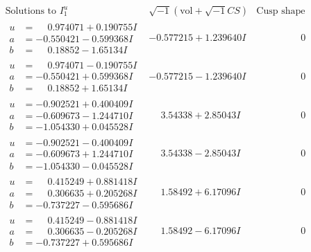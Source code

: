\documentclass[1p]{elsarticle_modified}
\theoremstyle{definition}
\newcommand{\I}{\sqrt{-1}}
\begin{document}
$$\begin{array}{c|c|c}  
\text{Solutions to }I^u_{1}& \I (\text{vol} + \sqrt{-1}CS) & \text{Cusp shape}\\
 \hline 
\begin{aligned}
u &= \phantom{-}0.974071 + 0.190755 I \\
a &= -0.550421 - 0.599368 I \\
b &= \phantom{-}0.18852 - 1.65134 I\end{aligned}
 & -0.577215 + 1.239640 I & \phantom{-0.000000 } 0 \\ \hline\begin{aligned}
u &= \phantom{-}0.974071 - 0.190755 I \\
a &= -0.550421 + 0.599368 I \\
b &= \phantom{-}0.18852 + 1.65134 I\end{aligned}
 & -0.577215 - 1.239640 I & \phantom{-0.000000 } 0 \\ \hline\begin{aligned}
u &= -0.902521 + 0.400409 I \\
a &= -0.609673 - 1.244710 I \\
b &= -1.054330 + 0.045528 I\end{aligned}
 & \phantom{-}3.54338 + 2.85043 I & \phantom{-0.000000 } 0 \\ \hline\begin{aligned}
u &= -0.902521 - 0.400409 I \\
a &= -0.609673 + 1.244710 I \\
b &= -1.054330 - 0.045528 I\end{aligned}
 & \phantom{-}3.54338 - 2.85043 I & \phantom{-0.000000 } 0 \\ \hline\begin{aligned}
u &= \phantom{-}0.415249 + 0.881418 I \\
a &= \phantom{-}0.306635 + 0.205268 I \\
b &= -0.737227 - 0.595686 I\end{aligned}
 & \phantom{-}1.58492 + 6.17096 I & \phantom{-0.000000 } 0 \\ \hline\begin{aligned}
u &= \phantom{-}0.415249 - 0.881418 I \\
a &= \phantom{-}0.306635 - 0.205268 I \\
b &= -0.737227 + 0.595686 I\end{aligned}
 & \phantom{-}1.58492 - 6.17096 I & \phantom{-0.000000 } 0 \\ \hline\begin{aligned}

\end{aligned}
\end{array}$$
\end{document}
